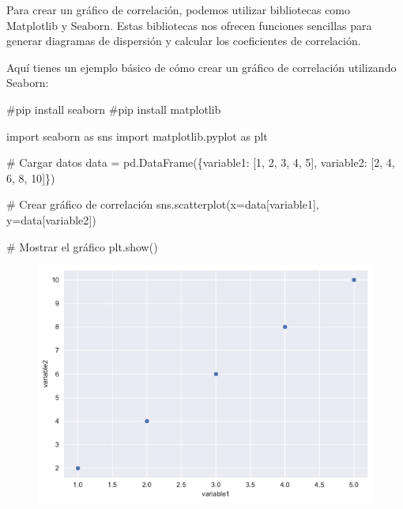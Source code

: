 \documentclass[
  a4paper,
]{article}
\newenvironment{Shaded}{}{}
\newcommand{\CommentTok}[1]{\textcolor[rgb]{0.42,0.45,0.49}{#1}}
\newcommand{\DecValTok}[1]{\textcolor[rgb]{0.00,0.36,0.77}{#1}}
\newcommand{\ImportTok}[1]{\textcolor[rgb]{0.01,0.18,0.38}{#1}}
\newcommand{\NormalTok}[1]{\textcolor[rgb]{0.14,0.16,0.18}{#1}}
\newcommand{\OperatorTok}[1]{\textcolor[rgb]{0.14,0.16,0.18}{#1}}
\newcommand{\StringTok}[1]{\textcolor[rgb]{0.01,0.18,0.38}{#1}}
\begin{document}
Para crear un gráfico de correlación, podemos utilizar bibliotecas como
Matplotlib y Seaborn. Estas bibliotecas nos ofrecen funciones sencillas
para generar diagramas de dispersión y calcular los coeficientes de
correlación.

Aquí tienes un ejemplo básico de cómo crear un gráfico de correlación
utilizando Seaborn:

\begin{Shaded}
\begin{Highlighting}[]
\CommentTok{\#pip install seaborn}
\CommentTok{\#pip install matplotlib}

\ImportTok{import}\NormalTok{ seaborn }\ImportTok{as}\NormalTok{ sns}
\ImportTok{import}\NormalTok{ matplotlib.pyplot }\ImportTok{as}\NormalTok{ plt}

\CommentTok{\# Cargar datos}
\NormalTok{data }\OperatorTok{=}\NormalTok{ pd.DataFrame(\{}\StringTok{\textquotesingle{}variable1\textquotesingle{}}\NormalTok{: [}\DecValTok{1}\NormalTok{, }\DecValTok{2}\NormalTok{, }\DecValTok{3}\NormalTok{, }\DecValTok{4}\NormalTok{, }\DecValTok{5}\NormalTok{],}
                     \StringTok{\textquotesingle{}variable2\textquotesingle{}}\NormalTok{: [}\DecValTok{2}\NormalTok{, }\DecValTok{4}\NormalTok{, }\DecValTok{6}\NormalTok{, }\DecValTok{8}\NormalTok{, }\DecValTok{10}\NormalTok{]\})}

\CommentTok{\# Crear gráfico de correlación}
\NormalTok{sns.scatterplot(x}\OperatorTok{=}\NormalTok{data[}\StringTok{\textquotesingle{}variable1\textquotesingle{}}\NormalTok{], y}\OperatorTok{=}\NormalTok{data[}\StringTok{\textquotesingle{}variable2\textquotesingle{}}\NormalTok{])}

\CommentTok{\# Mostrar el gráfico}
\NormalTok{plt.show()}
\end{Highlighting}
\end{Shaded}

\begin{figure}[H]

{\centering \includegraphics{index_files/figure-pdf/cell-28-output-1.pdf}

}

\end{figure}
\end{document}
